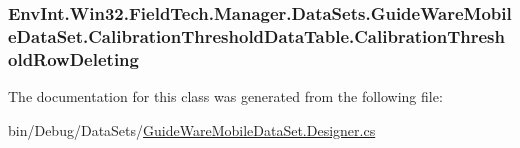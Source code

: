 \subsubsection[{Calibration\+Threshold\+Row\+Deleting}]{ Env\+Int.\+Win32.\+Field\+Tech.\+Manager.\+Data\+Sets.\+Guide\+Ware\+Mobile\+Data\+Set.\+Calibration\+Threshold\+Data\+Table.\+Calibration\+Threshold\+Row\+Deleting}\label{class_env_int_1_1_win32_1_1_field_tech_1_1_manager_1_1_data_sets_1_1_guide_ware_mobile_data_set_e4a98fb4b531becb042ae997c9d8a15c_a7a883e776cceb11455eee49d9571d9aa}


The documentation for this class was generated from the following file\+:\begin{DoxyCompactItemize}
\item 
bin/\+Debug/\+Data\+Sets/\hyperlink{bin_2_debug_2_data_sets_2_guide_ware_mobile_data_set_8_designer_8cs}{Guide\+Ware\+Mobile\+Data\+Set.\+Designer.\+cs}\end{DoxyCompactItemize}
